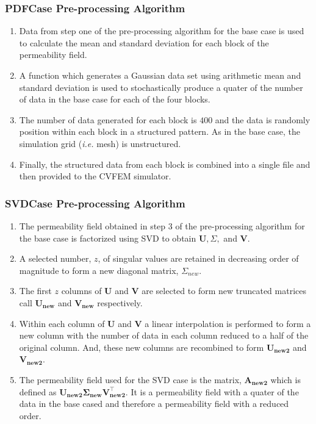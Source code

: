 \documentclass[preprint,12pt]{elsarticle}
\begin{document}
\subsubsection{PDFCase Pre-processing Algorithm}\label{subsubsection:pdfcase_preprocess_algorithm}
\begin{enumerate}[1]
  \item Data from step one of the pre-processing algorithm for the base case is used to calculate the mean and standard deviation for each block of the permeability field.
  \item A function which generates a Gaussian data set using arithmetic mean and standard deviation is used to stochastically produce a quater of the number of data in the base case for each of the four blocks.
  \item The number of data generated for each block is $400$ and the data is randomly position within each block in a structured pattern. As in the base case, the simulation grid ({\it i.e.} mesh) is unstructured.
  \item Finally, the structured data from each block is combined into a single file and then provided to the CVFEM simulator.
\end{enumerate}


\subsubsection{SVDCase Pre-processing Algorithm}\label{subsubsection:svdcase_preprocess_algorithm}
\begin{enumerate}[1]
  \item The permeability field obtained in step 3 of the pre-processing algorithm for the base case is factorized using SVD to obtain $\mathbf{U}, \Sigma,$ and $\mathbf{V}$.
  \item A selected number, $z$, of singular values are retained in decreasing order of magnitude to form a new diagonal matrix, $\Sigma_{new}$.
  \item The first $z$ columns of $\mathbf{U}$ and $\mathbf{V}$ are selected to form new truncated matrices call $\mathbf{U_{new}}$ and $\mathbf{V_{new}}$ respectively.
  \item Within each column of $\mathbf{U}$ and $\mathbf{V}$ a linear interpolation is performed to form a new column with the number of data in each column reduced to a half of the original column. And, these new columns are recombined to form $\mathbf{U_{new2}}$ and $\mathbf{V_{new2}}$.
  \item The permeability field used for the SVD case is the matrix, $\mathbf{A_{new2}}$ which is defined as $\mathbf{U_{new2}} \mathbf{\Sigma_{new}} \mathbf{V_{new2}^{\intercal}}$. It is a permeability field with a quater of the data in the base cased and therefore a permeability field with a reduced order.  
\end{enumerate}
\end{document}
